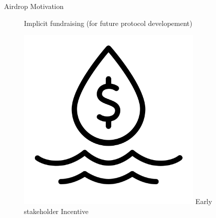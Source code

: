 \documentclass[handout]{beamer}
\begin{document}
\begin{frame}{Airdrop Motivation}
\begin{figure}[H]
\begin{minipage}[t]{.2\textwidth}
	\vspace{0.8em}\vspace{0.8em}    
    Implicit fundraising (for future protocol developement)
  \end{minipage}
  \hfill
  \begin{minipage}[t]{.2\textwidth}\vspace{20pt}%
  	\center 
	\includegraphics[width=0.8\textwidth]{../assets/images/liquidity.png}
    \vspace{0.8em}\vspace{0.8em}
    Early stakeholder Incentive
  \end{minipage}  
\end{figure}



\end{frame}
\end{document}
